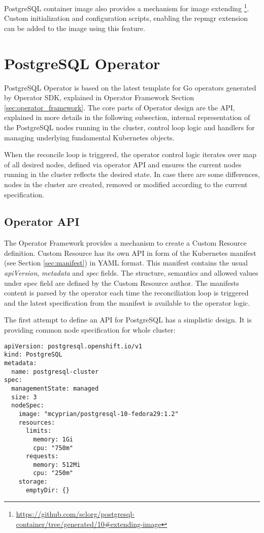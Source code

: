 \documentclass[
  digital, %
  twoside, %
  table,   %
  lof,     %
  lot,     %
]{fithesis3}
\begin{document}
PostgreSQL container image also provides a mechanism for image extending \footnote{\url{https://github.com/sclorg/postgresql-container/tree/generated/10\#extending-image}}. Custom initialization and configuration scripts, enabling the repmgr extension can be added to the image using this feature.

\section{PostgreSQL Operator}
PostgreSQL Operator is based on the latest template for Go operators generated by Operator SDK, explained in Operator Framework Section \ref{sec:operator_framework}. The core parts of Operator design are the API, explained in more details in the following subsection, internal representation of the PostgreSQL nodes running in the cluster, control loop logic and handlers for managing underlying fundamental Kubernetes objects.

When the reconcile loop is triggered, the operator control logic iterates over map of all desired nodes, defined via operator API and ensures the current nodes running in the cluster reflects the desired state. In case there are some differences, nodes in the cluster are created, removed or modified according to the current specification.

\subsection{Operator API} \label{sec:operator_api}
The Operator Framework provides a mechanism to create a Custom Resource definition. Custom Resource has its own API in form of the Kubernetes manifest (see Section \ref{sec:manifest}) in YAML format. This manifest contains the usual \textit{apiVersion}, \textit{metadata} and \textit{spec} fields. The structure, semantics and allowed values under spec field are defined by the Custom Resource author. The manifests content is parsed by the operator each time the reconciliation loop is triggered and the latest specification from the manifest is available to the operator logic.

The first attempt to define an API for PostgreSQL has a simplistic design.
It is providing common node specification for whole cluster:

\begin{lstlisting}
apiVersion: postgresql.openshift.io/v1
kind: PostgreSQL
metadata:
  name: postgresql-cluster
spec:
  managementState: managed
  size: 3
  nodeSpec:
    image: "mcyprian/postgresql-10-fedora29:1.2"
    resources:
      limits:
        memory: 1Gi
        cpu: "750m"
      requests:
        memory: 512Mi
        cpu: "250m"
    storage:
      emptyDir: {}
\end{lstlisting}
\end{document}
